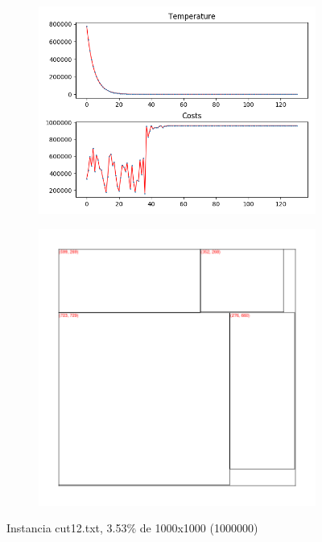 
\begin{figure}
\centering
\begin{subfigure}{.5\textwidth}
  \centering
  \includegraphics[width=1\linewidth]{results/cut12/1/plot}
  \label{fig:sub1}
\end{subfigure}%
\begin{subfigure}{.5\textwidth}
  \centering
  \includegraphics[width=1\linewidth]{results/cut12/1/cut}
  \label{fig:sub2}
\end{subfigure}
\caption{Instancia cut12.txt, 3.53\% de 1000x1000 (1000000)}
\label{fig:test}
\end{figure}


